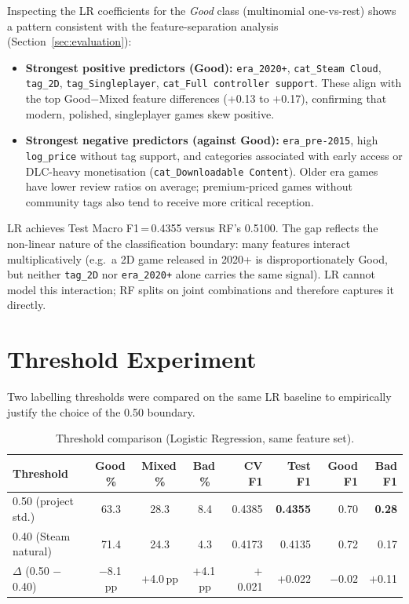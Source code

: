 \documentclass[11pt, a4paper]{article}
\newcommand{\ttf}[1]{\texttt{#1}}
\begin{document}
Inspecting the LR coefficients for the \textit{Good} class (multinomial one-vs-rest)
shows a pattern consistent with the feature-separation analysis (Section~\ref{sec:evaluation}):
\begin{itemize}
  \item \textbf{Strongest positive predictors (Good):}
        \ttf{era\_2020+}, \ttf{cat\_Steam Cloud}, \ttf{tag\_2D},
        \ttf{tag\_Singleplayer}, \ttf{cat\_Full controller support}.
        These align with the top Good$-$Mixed feature differences ($+$0.13 to $+$0.17),
        confirming that modern, polished, singleplayer games skew positive.
  \item \textbf{Strongest negative predictors (against Good):}
        \ttf{era\_pre-2015}, high \ttf{log\_price} without tag support, and
        categories associated with early access or DLC-heavy monetisation
        (\ttf{cat\_Downloadable Content}). Older era games have lower review ratios
        on average; premium-priced games without community tags also tend to
        receive more critical reception.
\end{itemize}

LR achieves Test Macro F1\,=\,0.4355 versus RF's 0.5100.
The gap reflects the non-linear nature of the classification boundary: many features
interact multiplicatively (e.g.\ a 2D game released in 2020+ is disproportionately
Good, but neither \ttf{tag\_2D} nor \ttf{era\_2020+} alone carries the same signal).
LR cannot model this interaction; RF splits on joint combinations and therefore
captures it directly.

\section{Threshold Experiment}
\label{sec:threshold}

Two labelling thresholds were compared on the same LR baseline to empirically
justify the choice of the 0.50 boundary.

\begin{table}[H]
  \centering\small
  \caption{Threshold comparison (Logistic Regression, same feature set).}
  \label{tab:threshold}
  \begin{tabular}{lcccrrrr}
    \toprule
    \textbf{Threshold} & \textbf{Good\,\%} & \textbf{Mixed\,\%} & \textbf{Bad\,\%} &
    \textbf{CV F1} & \textbf{Test F1} & \textbf{Good F1} & \textbf{Bad F1} \\
    \midrule
    0.50 (project std.) & 63.3 & 28.3 &  8.4 & 0.4385 & \textbf{0.4355} & 0.70 & \textbf{0.28} \\
    0.40 (Steam natural)& 71.4 & 24.3 &  4.3 & 0.4173 & 0.4135          & 0.72 & 0.17 \\
    \midrule
    $\Delta$ (0.50 $-$ 0.40) & $-$8.1\,pp & $+$4.0\,pp & $+$4.1\,pp &
    $+$0.021 & $+$0.022 & $-$0.02 & $+$0.11 \\
    \bottomrule
  \end{tabular}
\end{table}
\end{document}
